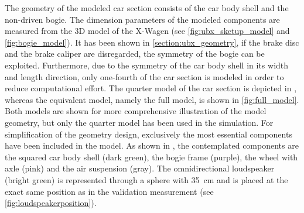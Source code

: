 The geometry of the modeled car section consists of the car body shell and the non-driven bogie. The dimension parameters of the modeled components are measured from the 3D model of the X-Wagen (see \cref{fig:ubx_sketup_model} and \cref{fig:bogie_model}). It has been shown in \cref{section:ubx_geometry}, if the brake disc and the brake caliper are disregarded, the symmetry of the bogie can be exploited. Furthermore, due to the symmetry of the car body shell in its width and length direction, only one-fourth of the car section is modeled in order to reduce computational effort. The quarter model of the car section is depicted in , whereas the equivalent model, namely the full model, is shown in \cref{fig:full_model}. Both models are shown for more comprehensive illustration of the model geometry, but only the quarter model has been used in the simulation. For simplification of the geometry design, exclusively the most essential components have been included in the model. As shown in , the contemplated components are the squared car body shell (dark green), the bogie frame (purple), the wheel with axle (pink) and the air suspension (gray). The omnidirectional loudspeaker (bright green) is represented through a sphere with \SI{35}{\centi\meter} and is placed at the exact same position as in the validation measurement (see \cref{fig:loudspeakerposition}). 

